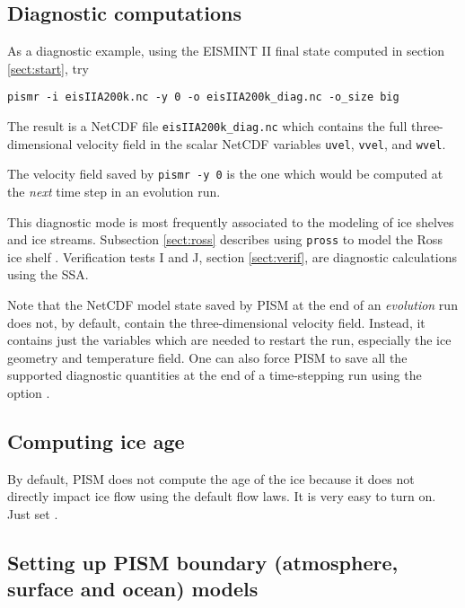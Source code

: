 \subsection{Diagnostic computations}  As a diagnostic example, using the EISMINT II final state computed in section \ref{sect:start}, try

\verb|pismr -i eisIIA200k.nc -y 0 -o eisIIA200k_diag.nc -o_size big|

\noindent The result is a NetCDF file \texttt{eisIIA200k_diag.nc} which contains the full three-dimensional velocity field in the scalar NetCDF variables \texttt{uvel}, \texttt{vvel}, and \texttt{wvel}.

The velocity field saved by \texttt{pismr -y 0} is the one which would be computed at the \emph{next} time step in an evolution run. 

This diagnostic mode is most frequently associated to the modeling of ice shelves and ice streams.  Subsection \ref{sect:ross} describes using \texttt{pross} to model the Ross ice shelf \cite{MacAyealetal}.  Verification tests I and J, section \ref{sect:verif}, are diagnostic calculations using the SSA.

Note that the NetCDF model state saved by PISM at the end of an \emph{evolution} run does not, by default, contain the three-dimensional velocity field.  Instead, it contains just the variables which are needed to restart the run, especially the ice geometry and temperature field.  One can also force PISM to save all the supported diagnostic quantities at the end of a time-stepping run using the option .


\subsection{Computing ice age} \label{subsect:age}
\renewcommand{\optindexsection}{Computing ice age}

By default, PISM does not compute the age of the ice because it does not directly impact ice flow using the default flow laws.   It is very easy to turn on.  Just set .

\subsection{Setting up PISM boundary (atmosphere, surface and ocean) models}
\label{sec:boundary-models}
\renewcommand{\optindexsection}{Climate (boundary) models}

